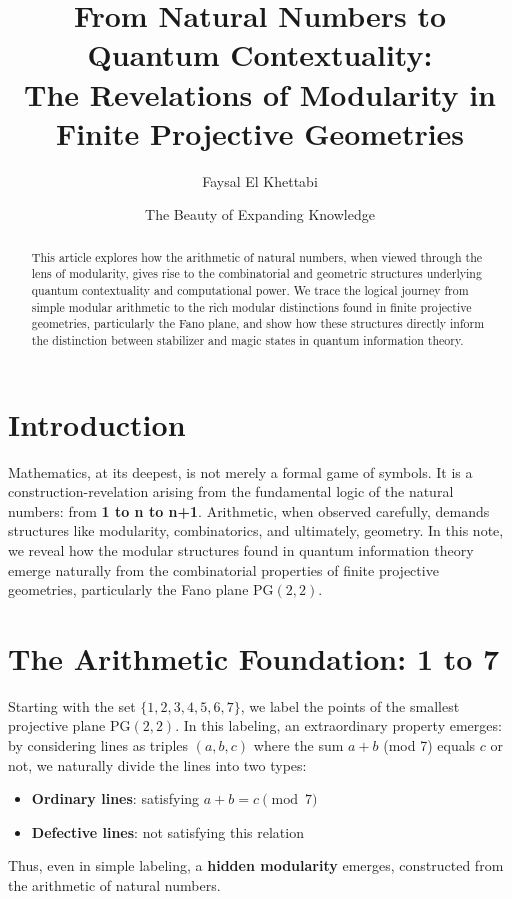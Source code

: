 \documentclass[11pt]{article}
\title{From Natural Numbers to Quantum Contextuality:\\ The Revelations of Modularity in Finite Projective Geometries}
\author{Faysal El Khettabi}
\affil{\texttt{faysal.el.khettabi@gmail.com}}
\affil{LinkedIn: \href{https://www.linkedin.com/in/faysal-el-khettabi-ph-d-4847415}{faysal-el-khettabi-ph-d-4847415}}
\date{The Beauty of Expanding Knowledge}
\begin{document}
\maketitle

\begin{abstract}
This article explores how the arithmetic of natural numbers, when viewed through the lens of modularity, gives rise to the combinatorial and geometric structures underlying quantum contextuality and computational power. We trace the logical journey from simple modular arithmetic to the rich modular distinctions found in finite projective geometries, particularly the Fano plane, and show how these structures directly inform the distinction between stabilizer and magic states in quantum information theory.
\end{abstract}

\section{Introduction}

Mathematics, at its deepest, is not merely a formal game of symbols. It is a construction-revelation arising from the fundamental logic of the natural numbers: from \textbf{1 to n to n+1}. Arithmetic, when observed carefully, demands structures like modularity, combinatorics, and ultimately, geometry. In this note, we reveal how the modular structures found in quantum information theory emerge naturally from the combinatorial properties of finite projective geometries, particularly the Fano plane $\mathrm{PG}(2,2)$.

\section{The Arithmetic Foundation: 1 to 7}

Starting with the set $\{1,2,3,4,5,6,7\}$, we label the points of the smallest projective plane $\mathrm{PG}(2,2)$. In this labeling, an extraordinary property emerges: by considering lines as triples $(a,b,c)$ where the sum $a+b$ (mod 7) equals $c$ or not, we naturally divide the lines into two types:
\begin{itemize}
    \item \textbf{Ordinary lines}: satisfying $a+b=c \pmod{7}$
    \item \textbf{Defective lines}: not satisfying this relation
\end{itemize}
Thus, even in simple labeling, a \textbf{hidden modularity} emerges, constructed from the arithmetic of natural numbers.
\end{document}
